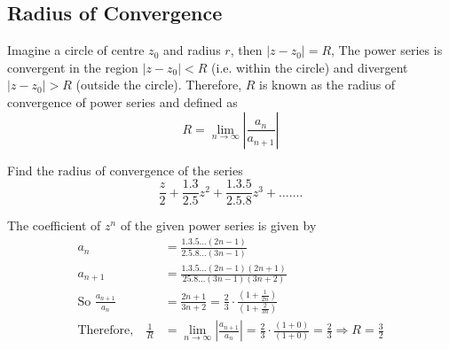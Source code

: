\subsection{Radius of Convergence}
Imagine a circle of centre $z_{0}$ and radius $r$, then $\left|z-z_{0}\right|=R$, 
The power series is convergent in the region $\left|z-z_{0}\right|<R$ (i.e. within the circle) and divergent $\left|z-z_{0}\right|>R$ (outside the circle). Therefore, $R$ is known as the radius of convergence of power series and defined as\\
$$R=\lim _{n \rightarrow \infty}\left|\frac{a_{n}}{a_{n+1}}\right|$$
\begin{exercise}
	Find the radius of convergence of the series
	$$
	\frac{z}{2}+\frac{1.3}{2.5} z^{2}+\frac{1.3 .5}{2.5 .8} z^{3}+\ldots \ldots .
	$$
\end{exercise}
\begin{answer}
	The coefficient of $z^{n}$ of the given power series is given by
	\begin{align*}
	a_{n}&=\frac{1.3 .5 \ldots(2 n-1)}{2.5 .8 \ldots(3 n-1)} \\
	a_{n+1}&=\frac{1.3 .5 \ldots(2 n-1)(2 n+1)}{25.8 \ldots(3 n-1)(3 n+2)}\\
	\text{So }\frac{a_{n+1}}{a_{n}}&=\frac{2 n+1}{3 n+2}=\frac{2}{3} \cdot \frac{\left(1+\frac{1}{2 n}\right)}{\left(1+\frac{2}{3 n}\right)}\\
	\text{Therefore,}\quad
	\frac{1}{R}&=\lim _{n \rightarrow \infty}\left|\frac{a_{n+1}}{a_{n}}\right|=\frac{2}{3} \cdot \frac{(1+0)}{(1+0)}=\frac{2}{3} \Rightarrow R=\frac{3}{2}
	\end{align*}
\end{answer}
